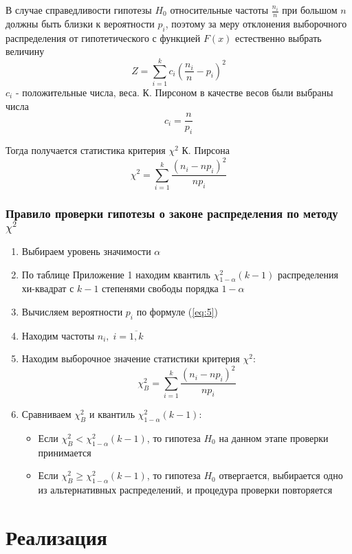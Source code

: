 \documentclass[a4paper, 12pt]{article}
\begin{document}
В случае справедливости гипотезы $H_0$ относительные частоты $\frac{n_i}{n}$ при большом $n$ должны быть близки к вероятности $p_i$, поэтому за меру отклонения выборочного распределения от гипотетического с функцией $F(x)$ естественно выбрать величину
$$
Z = \sum^k_{i=1}c_i \left( \frac{n_i}{n} - p_i \right)^2
$$
$c_i$ - положительные числа, веса. К. Пирсоном в качестве весов были выбраны числа 
\begin{equation}
c_i = \frac{n}{p_i}
\label{eq:6}
\end{equation}

Тогда получается статистика критерия $\chi^2$  К. Пирсона
$$
\chi^2 = \sum^k_{i=1}  \frac{(n_i - np_i)^2}{np_i}
$$

\subsubsection{Правило проверки гипотезы о законе распределения по методу $\chi^2$}

\begin{enumerate}
	\item Выбираем уровень значимости $\alpha$
	\item По таблице Приложение 1 находим квантиль $\chi^2_{1 - \alpha}(k-1)$ распределения хи-квадрат с $k-1$ степенями свободы порядка $1 - \alpha$
	\item Вычисляем вероятности $p_i$ по формуле (\ref{eq:5})
	\item Находим частоты $n_i, \; i=\overline{1,k}$
	\item Находим выборочное значение статистики критерия $\chi^2$:
	$$
	\chi^2_B = \sum^k_{i=1} \frac{(n_i - np_i)^2}{np_i}
	$$
	\item Сравниваем $\chi^2_B$ и квантиль $\chi^2_{1 - \alpha}(k-1)$:
	\begin{itemize}
		\item Если $\chi^2_B < \chi^2_{1 - \alpha}(k-1)$, то гипотеза $H_0$ на данном этапе проверки принимается
		\item Если $\chi^2_B \ge \chi^2_{1 - \alpha}(k-1)$, то гипотеза $H_0$ отвергается, выбирается одно из альтернативных распределений, и процедура проверки повторяется
	\end{itemize}
\end{enumerate}

\newpage
\section{Реализация}
\end{document}
